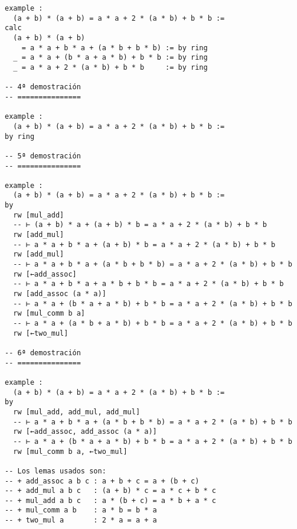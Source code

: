 \begin{verbatim}
example :
  (a + b) * (a + b) = a * a + 2 * (a * b) + b * b :=
calc
  (a + b) * (a + b)
    = a * a + b * a + (a * b + b * b) := by ring
  _ = a * a + (b * a + a * b) + b * b := by ring
  _ = a * a + 2 * (a * b) + b * b     := by ring

-- 4ª demostración
-- ===============

example :
  (a + b) * (a + b) = a * a + 2 * (a * b) + b * b :=
by ring

-- 5ª demostración
-- ===============

example :
  (a + b) * (a + b) = a * a + 2 * (a * b) + b * b :=
by
  rw [mul_add]
  -- ⊢ (a + b) * a + (a + b) * b = a * a + 2 * (a * b) + b * b
  rw [add_mul]
  -- ⊢ a * a + b * a + (a + b) * b = a * a + 2 * (a * b) + b * b
  rw [add_mul]
  -- ⊢ a * a + b * a + (a * b + b * b) = a * a + 2 * (a * b) + b * b
  rw [←add_assoc]
  -- ⊢ a * a + b * a + a * b + b * b = a * a + 2 * (a * b) + b * b
  rw [add_assoc (a * a)]
  -- ⊢ a * a + (b * a + a * b) + b * b = a * a + 2 * (a * b) + b * b
  rw [mul_comm b a]
  -- ⊢ a * a + (a * b + a * b) + b * b = a * a + 2 * (a * b) + b * b
  rw [←two_mul]

-- 6ª demostración
-- ===============

example :
  (a + b) * (a + b) = a * a + 2 * (a * b) + b * b :=
by
  rw [mul_add, add_mul, add_mul]
  -- ⊢ a * a + b * a + (a * b + b * b) = a * a + 2 * (a * b) + b * b
  rw [←add_assoc, add_assoc (a * a)]
  -- ⊢ a * a + (b * a + a * b) + b * b = a * a + 2 * (a * b) + b * b
  rw [mul_comm b a, ←two_mul]

-- Los lemas usados son:
-- + add_assoc a b c : a + b + c = a + (b + c)
-- + add_mul a b c   : (a + b) * c = a * c + b * c
-- + mul_add a b c   : a * (b + c) = a * b + a * c
-- + mul_comm a b    : a * b = b * a
-- + two_mul a       : 2 * a = a + a
\end{verbatim}

